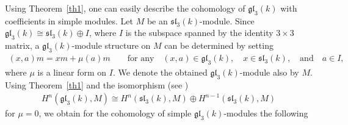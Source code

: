 \documentclass[10pt,a4paper]{amsart}
\numberwithin{equation}{section}
\begin{document}
Using Theorem~\ref{th1}, one can easily describe the cohomology of $\mathfrak{gl}_3(k)$ with coefficients in simple modules. Let $M$ be an $\mathfrak{sl}_3(k)$-module.
Since $\mathfrak{gl}_3(k)\cong \mathfrak{sl}_3(k)\oplus I$, where $I$ is the subspace spanned by the identity
$3\times 3$ matrix, a $\mathfrak{gl}_3(k)$-module structure on $M$ can be
determined by setting
\begin{gather}
(x,a)m=xm+\mu(a)m\qquad \text{for any}\quad (x,a)\in \mathfrak{gl}_3(k),\quad
x\in\mathfrak{sl}_3(k),\quad\text{and}\quad a\in I,\label{eq0}
\end{gather}
where $\mu$ is a linear form on $I$. We denote the obtained $\mathfrak{gl}_3(k)$-module
also by $M$. Using Theorem~\ref{th1} and the isomorphism (see \cite[p.~737]{IT21})
\begin{gather*}
H^n(\mathfrak{gl}_3(k),M)\cong H^n(\mathfrak{sl}_3(k),M)\oplus H^{n-1}(\mathfrak{sl}_3(k),M)
\end{gather*}
for $\mu=0$, we obtain for the cohomology of simple $\mathfrak{gl}_3(k)$-modules the following
\end{document}
